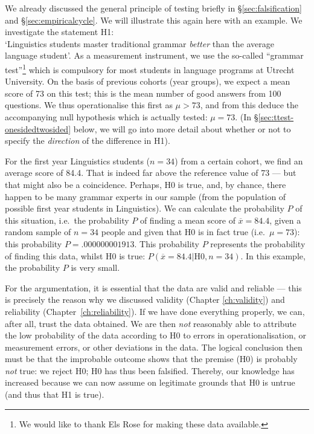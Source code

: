 \documentclass[
]{book}
\begin{document}
We already discussed the general principle of testing briefly in
§\ref{sec:falsification} and §\ref{sec:empiricalcycle}.
We will illustrate this again here
with an example. We investigate the statement H1:\\
`Linguistics students master traditional grammar \emph{better} than the average language student'. As a measurement instrument, we use the so-called ``grammar test''\footnote{We would like to thank Els Rose for making these data available.} which is compulsory
for most students
in language programs at Utrecht University. On the basis of previous cohorts (year groups),
we expect a mean score of 73 on this test; this is the mean number of good answers
from 100 questions. We thus operationalise this first as \(\mu > 73\), and from this deduce
the accompanying null hypothesis which is actually tested:
\(\mu = 73\).
(In §\ref{sec:ttest-onesidedtwosided} below, we will go into more detail
about whether or not to specify the \emph{direction} of the difference in H1).

For the first year Linguistics students (\(n=34\)) from a certain cohort,
we find an average score of 84.4. That is indeed far above the reference value
of 73 --- but that might also be a coincidence.
Perhaps, H0 is true, and, by chance, there happen to be many grammar experts
in our sample (from the population of possible first year students
in Linguistics). We can calculate the probability \(P\) of this situation,
i.e.~the probability \(P\) of finding a mean score of \(\overline{x}=84.4\),
given a random sample of \(n=34\) people and given that
H0 is in fact true (i.e.~\(\mu=73\)): this probability
\(P=.000000001913\). This probability \(P\) represents the probability of finding this
data, whilst H0 is true:
\(P(\overline{x}=84.4|\textrm{H0},n=34)\).
In this example, the probability \(P\) is very small.

For the argumentation, it is essential that the data are valid and
reliable --- this is precisely the reason why we discussed validity
(Chapter \ref{ch:validity}) and reliability
(Chapter~\ref{ch:reliability}). If we have done everything properly,
we can, after all, trust the data obtained.
We are then \emph{not} reasonably able to attribute the low probability of the data according
to H0 to errors in operationalisation, or measurement errors, or other deviations in the data.
The logical conclusion then must be that the improbable outcome shows that the
premise (H0) is probably \emph{not} true: we reject H0; H0 has thus been
falsified. Thereby, our knowledge has increased because we can now
assume on legitimate grounds that H0 is untrue (and thus that H1
is true).
\end{document}

